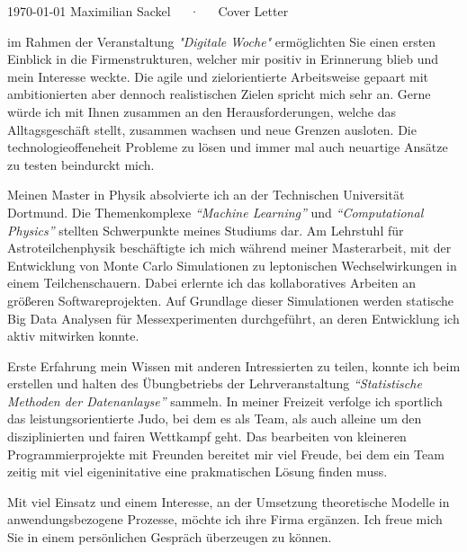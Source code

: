 \documentclass[11pt, a4paper]{Awesome-CV/awesome-cv}
\begin{document}
\makecvheader[R]

\makecvfooter
{\today}
{Maximilian Sackel~~~·~~~Cover Letter}
{}

\makelettertitle

\begin{cvletter}
    im Rahmen der Veranstaltung \textit{"Digitale Woche"} ermöglichten Sie einen ersten Einblick in die Firmenstrukturen,
    welcher mir positiv in Erinnerung blieb und mein Interesse weckte.
    Die agile und zielorientierte Arbeitsweise gepaart mit ambitionierten aber
    dennoch realistischen Zielen spricht mich sehr an.
    Gerne würde ich mit Ihnen zusammen an den Herausforderungen,
    welche das Alltagsgeschäft stellt,
    zusammen wachsen und neue Grenzen ausloten.
    Die technologieoffeneheit Probleme zu lösen und immer mal auch neuartige
    Ansätze zu testen beindurckt mich.

    Meinen Master in Physik absolvierte ich an der Technischen Universität Dortmund.
    Die Themenkomplexe \textit{``Machine Learning''} und \textit{``Computational Physics''} stellten Schwerpunkte meines Studiums dar.
    Am Lehrstuhl für Astroteilchenphysik beschäftigte ich mich während meiner Masterarbeit,
    mit der Entwicklung von Monte Carlo Simulationen zu leptonischen Wechselwirkungen in einem Teilchenschauern.
    Dabei erlernte ich das kollaboratives Arbeiten an größeren Softwareprojekten.
    Auf Grundlage dieser Simulationen werden statische Big Data Analysen für Messexperimenten durchgeführt,
    an deren Entwicklung ich aktiv mitwirken konnte.

    Erste Erfahrung mein Wissen mit anderen Intressierten zu teilen,
    konnte ich beim erstellen und halten des Übungbetriebs der Lehrveranstaltung
    \textit{``Statistische Methoden der Datenanlayse''} sammeln.
    In meiner Freizeit verfolge ich sportlich das leistungsorientierte Judo,
    bei dem es als Team, als auch alleine um den disziplinierten und fairen
    Wettkampf geht.
    Das bearbeiten von kleineren Programmierprojekte mit Freunden bereitet mir viel Freude,
    bei dem ein Team zeitig mit viel eigeninitative eine prakmatischen Lösung
    finden muss.

    Mit viel Einsatz und einem Interesse,
    an der Umsetzung theoretische Modelle in anwendungsbezogene Prozesse,
    möchte ich ihre Firma ergänzen.
    Ich freue mich Sie in einem persönlichen Gespräch überzeugen zu können.

\end{cvletter}


\makeletterclosing
\end{document}
